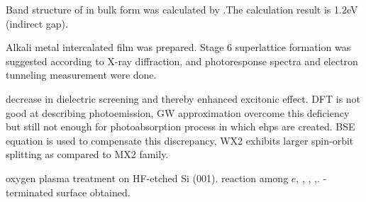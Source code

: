Band structure  of  in bulk form was calculated by \citeauthor{Mattheiss1973}.The calculation result is 1.2eV (indirect gap).\cite{Mattheiss1973}

Alkali metal intercalated  film was prepared.\cite{Homyonfer1997} Stage 6 superlattice formation was suggested according to X-ray diffraction, and photoresponse spectra and electron tunneling measurement were done.

decrease in dielectric screening and thereby enhanced excitonic effect.
DFT is not good at describing photoemission, GW approximation overcome this deficiency but still not enough for photoabsorption process in which ehps are created. BSE equation is used to compensate this discrepancy, WX2 exhibits larger spin-orbit splitting as compared to MX2 family.\cite{Ramasubramaniam2012}

oxygen plasma treatment on HF-etched Si (001). reaction among $e$, , , ,. -terminated surface obtained.\cite{Habib2010}